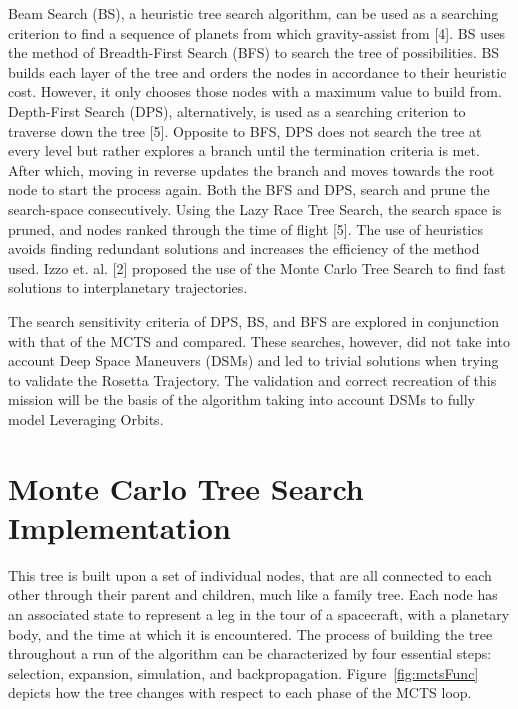 \documentclass[letterpaper, preprint, paper,11pt]{AAS}	%
\begin{document}
Beam Search (BS), a heuristic tree search algorithm, can be used as a searching criterion to find a sequence of planets from which gravity-assist from [4]. BS uses the method of Breadth-First Search (BFS) to search the tree of possibilities. BS builds each layer of the tree and orders the nodes in accordance to their heuristic cost. However, it only chooses those nodes with a maximum value to build from. Depth-First Search (DPS), alternatively, is used as a searching criterion to traverse down the tree [5]. Opposite to BFS, DPS does not search the tree at every level but rather explores a branch until the termination criteria is met. After which, moving in reverse updates the branch and moves towards the root node to start the process again. Both the BFS and DPS, search and prune the search-space consecutively. Using the Lazy Race Tree Search, the search space is pruned, and nodes ranked through the time of flight [5]. The use of heuristics avoids finding redundant solutions and increases the efficiency of the method used. Izzo et. al. [2] proposed the use of the Monte Carlo Tree Search to find fast solutions to interplanetary trajectories. 

The search sensitivity criteria of DPS, BS, and BFS are explored in conjunction with that of the MCTS and compared. These searches, however, did not take into account Deep Space Maneuvers (DSMs) and led to trivial solutions when trying to validate the Rosetta Trajectory. The validation and correct recreation of this mission will be the basis of the algorithm taking into account DSMs to fully model Leveraging Orbits.

\section{Monte Carlo Tree Search Implementation}

This tree is built upon a set of individual nodes, that are all connected to each other through their parent and children, much like a family tree. Each node has an associated state to represent a leg in the tour of a spacecraft, with a planetary body, and the time at which it is encountered. The process of building the tree throughout a run of the algorithm can be characterized by four essential steps: selection, expansion, simulation, and backpropagation. Figure~\ref*{fig:mctsFunc} depicts how the tree changes with respect to each phase of the MCTS loop. 
\end{document}
